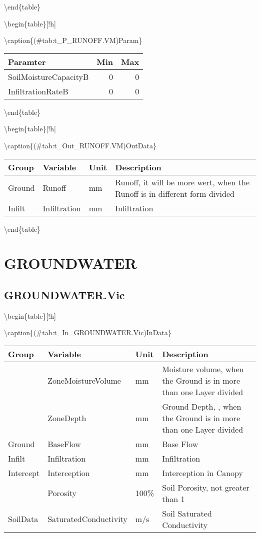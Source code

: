 \documentclass[
]{book}
\begin{document}
\textbackslash end\{table\}

\textbackslash begin\{table\}{[}!h{]}

\textbackslash caption\{(\#tab:t\_P\_RUNOFF.VM)Param\}
\centering

\begin{tabular}[t]{l|r|r}
\hline
Paramter & Min & Max\\
\hline
SoilMoistureCapacityB & 0 & 0\\
\cline{1-3}
InfiltrationRateB & 0 & 0\\
\hline
\end{tabular}

\textbackslash end\{table\}

\textbackslash begin\{table\}{[}!h{]}

\textbackslash caption\{(\#tab:t\_Out\_RUNOFF.VM)OutData\}
\centering

\begin{tabular}[t]{l|l|l|l}
\hline
Group & Variable & Unit & Description\\
\hline
Ground & Runoff & mm & Runoff, it will be more wert, when the Runoff is in different form divided\\
\cline{1-4}
Infilt & Infiltration & mm & Infiltration\\
\hline
\end{tabular}

\textbackslash end\{table\}

\hypertarget{groundwater}{%
\section{GROUNDWATER}\label{groundwater}}

\hypertarget{groundwater.vic}{%
\subsection{GROUNDWATER.Vic}\label{groundwater.vic}}

\textbackslash begin\{table\}{[}!h{]}

\textbackslash caption\{(\#tab:t\_In\_GROUNDWATER.Vic)InData\}
\centering

\begin{tabular}[t]{l|l|l|l}
\hline
Group & Variable & Unit & Description\\
\hline
 & ZoneMoistureVolume & mm & Moisture volume, when the Ground is in more than one Layer divided\\
\cline{2-4}
 & ZoneDepth & mm & Ground Depth, , when the Ground is in more than one Layer divided\\
\cline{2-4}
\multirow{-3}{*}{\raggedright\arraybackslash Ground} & BaseFlow & mm & Base Flow\\
\cline{1-4}
Infilt & Infiltration & mm & Infiltration\\
\cline{1-4}
Intercept & Interception & mm & Interception in Canopy\\
\cline{1-4}
 & Porosity & 100\% & Soil Porosity, not greater than 1\\
\cline{2-4}
\multirow{-2}{*}{\raggedright\arraybackslash SoilData} & SaturatedConductivity & m/s & Soil Saturated Conductivity\\
\hline
\end{tabular}
\end{document}
